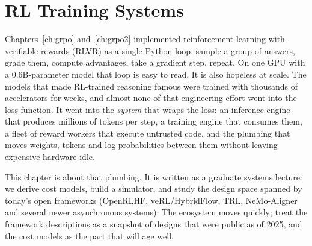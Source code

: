 \chapter{RL Training Systems}\label{ch:rlsys}

Chapters~\ref{ch:grpo} and~\ref{ch:grpo2} implemented reinforcement learning with verifiable
rewards (RLVR) as a single Python loop: sample a group of answers, grade them, compute
advantages, take a gradient step, repeat. On one GPU with a 0.6B-parameter model that loop is
easy to read. It is also hopeless at scale. The models that made RL-trained reasoning famous
were trained with thousands of accelerators for weeks, and almost none of that engineering
effort went into the loss function. It went into the \emph{system} that wraps the loss: an
inference engine that produces millions of tokens per step, a training engine that consumes
them, a fleet of reward workers that execute untrusted code, and the plumbing that moves
weights, tokens and log-probabilities between them without leaving expensive hardware idle.

This chapter is about that plumbing. It is written as a graduate systems lecture: we derive cost models, build
a simulator, and study the design space spanned by today's open frameworks (OpenRLHF,
veRL/HybridFlow, TRL, NeMo-Aligner and several newer asynchronous systems). The ecosystem moves
quickly; treat the framework descriptions as a snapshot of designs that were public as of 2025,
and the cost models as the part that will age well.


